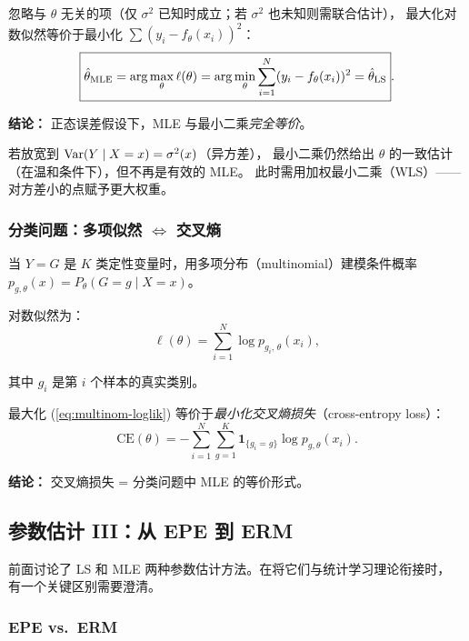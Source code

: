 忽略与 $\theta$ 无关的项（仅 $\sigma^2$ 已知时成立；若 $\sigma^2$ 也未知则需联合估计），
最大化对数似然等价于最小化 $\sum (y_i - f_\theta(x_i))^2$：
\begin{equation}
    \boxed{\hat{\theta}_{\mathrm{MLE}} = \arg\max_\theta \ell(\theta)
           = \arg\min_\theta \sum_{i=1}^{N} (y_i - f_\theta(x_i))^2
           = \hat{\theta}_{\mathrm{LS}}}.
\end{equation}

\textbf{结论：} 正态误差假设下，MLE 与最小二乘\emph{完全等价}。

若放宽到 $\mathrm{Var}(Y \mid X = x) = \sigma^2(x)$（异方差），
最小二乘仍然给出 $\theta$ 的一致估计（在温和条件下），但不再是有效的 MLE。
此时需用加权最小二乘（WLS）——对方差小的点赋予更大权重。

\subsubsection{分类问题：多项似然 $\Leftrightarrow$ 交叉熵}

当 $Y = G$ 是 $K$ 类定性变量时，用多项分布（multinomial）建模条件概率
$p_{g,\theta}(x) = P_\theta(G = g \mid X = x)$。

对数似然为：
\begin{equation}\label{eq:multinom-loglik}
    \ell(\theta) = \sum_{i=1}^{N} \log p_{g_i,\,\theta}(x_i),
\end{equation}

其中 $g_i$ 是第 $i$ 个样本的真实类别。

最大化 (\ref{eq:multinom-loglik}) 等价于\emph{最小化交叉熵损失}（cross-entropy loss）：
\begin{equation}
    \mathrm{CE}(\theta) = -\sum_{i=1}^{N} \sum_{g=1}^{K} \mathbf{1}_{\{g_i = g\}} \log p_{g,\theta}(x_i).
\end{equation}

\textbf{结论：} 交叉熵损失 = 分类问题中 MLE 的等价形式。

\subsection{参数估计 III：从 EPE 到 ERM}

前面讨论了 LS 和 MLE 两种参数估计方法。在将它们与统计学习理论衔接时，
有一个关键区别需要澄清。

\subsubsection{EPE vs.\ ERM}

